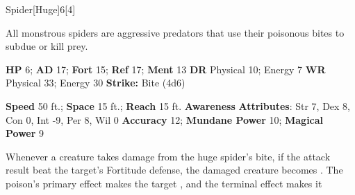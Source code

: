   \begin{monsection}{Spider}[Huge]{6}[4]
    \vspace{-1em}\vspace{-1em}
    \vspace{0em}

    
    All monstrous spiders are aggressive predators that use their poisonous bites to subdue or kill prey.
  

    \begin{spellcontent}
      \begin{spelltargetinginfo}
        \pari \textbf{HP} 6;
          \textbf{AD} 17;
          \textbf{Fort} 15;
          \textbf{Ref} 17;
          \textbf{Ment} 13
        \pari \textbf{DR} Physical 10; Energy 7
        \pari \textbf{WR} Physical 33; Energy 30
        \pari \textbf{Strike:}
            Bite  (4d6)
      \end{spelltargetinginfo}
    \end{spellcontent}
    \begin{monsterfooter}
      \pari \textbf{Speed} 50 ft.;
        \textbf{Space} 15 ft.;
        \textbf{Reach} 15 ft.
      \pari \textbf{Awareness} 
      \pari \textbf{Attributes}:
        Str 7, Dex 8,
        Con 0, Int -9,
        Per 8, Wil 0
      \pari \textbf{Accuracy} 12;
        \textbf{Mundane Power} 10;
      \textbf{Magical Power} 9
    \end{monsterfooter}
  \end{monsection}
    Whenever a creature takes damage from the huge spider's bite,
      if the attack result beat the target's Fortitude defense,
      the damaged creature becomes .
    The poison's primary effect makes the target , and the terminal effect makes it 
  
